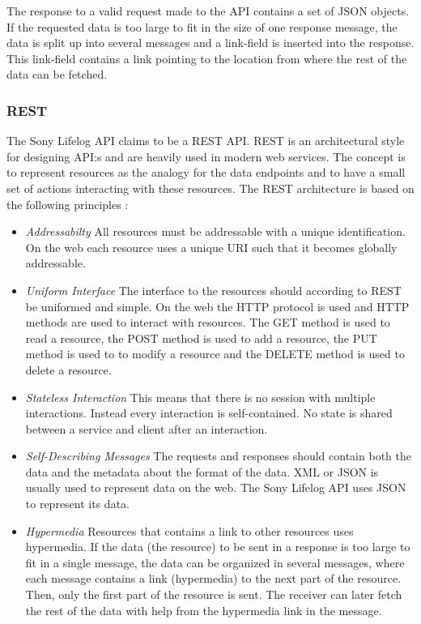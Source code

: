 \documentclass{cslthse-msc}
\begin{document}
The response to a valid request made to the API contains a set of JSON objects. If the requested data is too large to fit in the size of one response message, the data is split up into several messages and a link-field is inserted into the response. This link-field contains a link pointing to the location from where the rest of the data can be fetched. 


\subsubsection{REST}
\label{sec:rest}

The Sony Lifelog API claims to be a REST API. REST is an architectural style for designing API:s and are heavily used in modern web services. The concept is to represent resources as the analogy for the data endpoints and to have a small set of actions interacting with these resources. The REST architecture is based on the following principles \cite{pautasso2014restful}:

\begin{itemize}
    \item \emph{Addressabilty} All resources must be addressable with a unique identification. On the web each resource uses a unique URI such that it becomes globally addressable.
    \item \emph{Uniform Interface} The interface to the resources should according to REST be uniformed and simple. On the web the HTTP protocol is used and HTTP methods are used to interact with resources. The GET method is used to read a resource, the POST method is used to add a resource, the PUT method is used to to modify a resource and the DELETE method is used to delete a resource.
    \item \emph{Stateless Interaction} This means that there is no session with multiple interactions. Instead every interaction is self-contained. No state is shared between a service and client after an interaction.
    \item \emph{Self-Describing Messages} The requests and responses should contain both the data and the metadata about the format of the data. XML or JSON is usually used to represent data on the web. The Sony Lifelog API uses JSON to represent its data.
\item \emph{Hypermedia} Resources that contains a link to other resources uses hypermedia. If the data (the resource) to be sent in a response is too large to fit in a single message, the data can be organized in several messages, where each message contains a link (hypermedia) to the next part of the resource. Then, only the first part of the resource is sent. The receiver can later fetch the rest of the data with help from the hypermedia link in the message.

\end{itemize}
\end{document}
